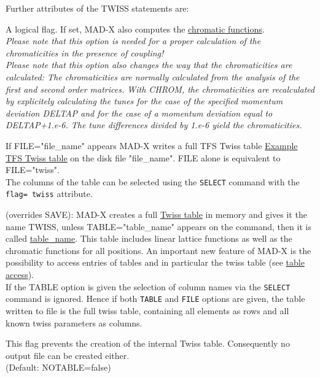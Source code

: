 Further attributes of the TWISS statements are: 
\begin{madlist}

    A logical flag. If set, MAD-X also computes the
     \href{../Introduction/tables.html#chrom}{chromatic
       functions}.  \\
     \textit{Please note that this option is needed for a proper
       calculation of the chromaticities in the presence of coupling!}\\
     \textit{Please note that this option also changes the way that the
       chromaticities are calculated: The chromaticities are normally
       calculated from the analysis of the first and second order
       matrices. With CHROM, the chromaticities are recalculated by
       explicitely calculating the tunes for the case of the specified momentum
       deviation DELTAP and for the case of a momentum deviation equal
       to DELTAP+1.e-6. The tune differences divided by 1.e-6 yield the
       chromaticities.}

    If FILE="file\_name" appears MAD-X writes a full TFS
     Twiss table \href{../Introduction/select.html#tfs}{Example TFS
       Twiss table} on the disk file "file\_name". FILE alone is
     equivalent to FILE="twiss".\\
     The columns of the table can be selected using the {\tt SELECT}
     command with the {\tt flag= twiss} attribute. 

    (overrides SAVE): MAD-X creates a full
     \href{../Introduction/tables.html#linear}{Twiss table} in
     memory and gives it the name TWISS, unless TABLE="table\_name"
     appears on the command, then it is called
     \href{../Introduction/label.html}{table\_name}. This table
     includes linear lattice functions as well as the chromatic
     functions for all positions. An important new feature of MAD-X
     is the possibility to access entries of tables and in
     particular the twiss table (see
     \href{../Introduction/expression.html#table}{table access}).\\
     If the TABLE option is given the selection of column names via the
     {\tt SELECT} command is ignored. Hence if both {\tt TABLE} and
     {\tt FILE} options are given, the table written to file is the full
     twiss table, containing all elements as rows and all known twiss 
     parameters as columns. 

    This flag prevents the creation of the internal Twiss
     table. Consequently no output file can be created either.  \\ 
     (Default: NOTABLE=false)


\end{madlist}
